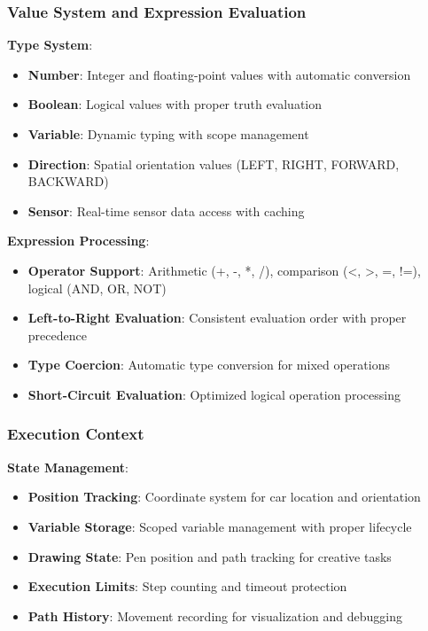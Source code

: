 \subsubsection{Value System and Expression Evaluation}
\textbf{Type System}:
\begin{itemize}
    \item \textbf{Number}: Integer and floating-point values with automatic conversion
    \item \textbf{Boolean}: Logical values with proper truth evaluation
    \item \textbf{Variable}: Dynamic typing with scope management
    \item \textbf{Direction}: Spatial orientation values (LEFT, RIGHT, FORWARD, BACKWARD)
    \item \textbf{Sensor}: Real-time sensor data access with caching
\end{itemize}

\textbf{Expression Processing}:
\begin{itemize}
    \item \textbf{Operator Support}: Arithmetic (+, -, *, /), comparison (<, >, =, !=), logical (AND, OR, NOT)
    \item \textbf{Left-to-Right Evaluation}: Consistent evaluation order with proper precedence
    \item \textbf{Type Coercion}: Automatic type conversion for mixed operations
    \item \textbf{Short-Circuit Evaluation}: Optimized logical operation processing
\end{itemize}

\subsubsection{Execution Context}
\textbf{State Management}:
\begin{itemize}
    \item \textbf{Position Tracking}: Coordinate system for car location and orientation
    \item \textbf{Variable Storage}: Scoped variable management with proper lifecycle
    \item \textbf{Drawing State}: Pen position and path tracking for creative tasks
    \item \textbf{Execution Limits}: Step counting and timeout protection
    \item \textbf{Path History}: Movement recording for visualization and debugging
\end{itemize}

